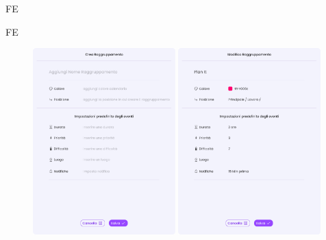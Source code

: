\begin{listaPersonale}{FE}
\begin{listaPersonale2}{FE}
        \begin{center} 
            \begin{figure}[H]
            \centering\includegraphics[width=0.49\textwidth,height=0.35\textheight]{img/FrontEnd/Eventi/Raggruppamento/CreaRaggruppamento.png}
            \centering\includegraphics[width=0.49\textwidth,height=0.35\textheight]{img/FrontEnd/Eventi/Raggruppamento/ModificaRaggruppamento.png}
            \end{figure}
        \end{center}
        


\end{listaPersonale2}
\end{listaPersonale}
